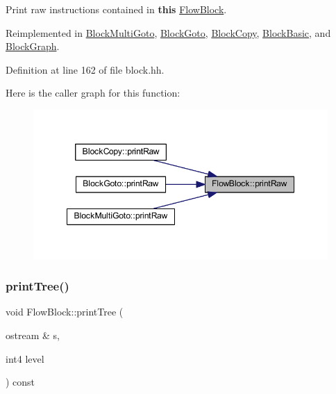Print raw instructions contained in {\bfseries{this}} \mbox{\hyperlink{class_flow_block}{Flow\+Block}}. 



Reimplemented in \mbox{\hyperlink{class_block_multi_goto_a56b9c331488b4bf0c0f01cc583192630}{Block\+Multi\+Goto}}, \mbox{\hyperlink{class_block_goto_aa665d1bc9ba041f0c90c52322abf5727}{Block\+Goto}}, \mbox{\hyperlink{class_block_copy_aa648abadc84c98ba2d49902f9faac957}{Block\+Copy}}, \mbox{\hyperlink{class_block_basic_a5981c3195bd4c3fd7be7e750a580bbca}{Block\+Basic}}, and \mbox{\hyperlink{class_block_graph_abcae771fc675bcc52c78b2f1dc0ab98a}{Block\+Graph}}.



Definition at line 162 of file block.\+hh.

Here is the caller graph for this function\+:
\nopagebreak
\begin{figure}[H]
\begin{center}
\leavevmode
\includegraphics[width=348pt]{class_flow_block_aa5bd09d25026872141e42118b03119b1_icgraph}
\end{center}
\end{figure}
\mbox{\label{class_flow_block_ae00f14fc1916599ec34074fbb010c74b}} 
\subsubsection{\texorpdfstring{printTree()}{printTree()}}
{\footnotesize\ttfamily void Flow\+Block\+::print\+Tree (\begin{DoxyParamCaption}\item[{ostream \&}]{s,  }\item[{int4}]{level }\end{DoxyParamCaption}) const\hspace{0.3cm}{\ttfamily [virtual]}}




